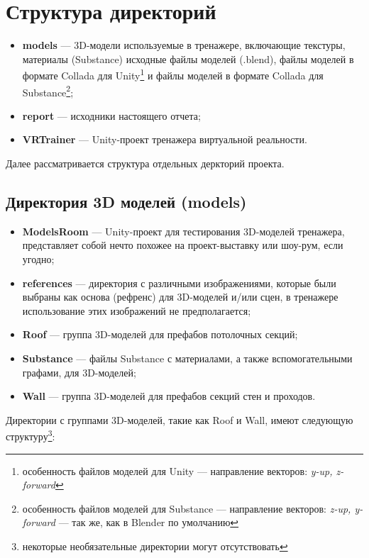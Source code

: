 




\section{Структура директорий}

\begin{itemize}
	\item \textbf{models} --- 3D-модели используемые в тренажере, включающие текстуры, материалы (Substance) исходные файлы моделей (.blend), файлы моделей в формате Collada для Unity\footnote{особенность файлов моделей для Unity --- направление векторов: \textit{y-up, z-forward}} и файлы моделей в формате Collada для Substance\footnote{особенность файлов моделей для Substance --- направление векторов: \textit{z-up, y-forward} --- так же, как в Blender по умолчанию};
	\item \textbf{report} --- исходники настоящего отчета;
	\item \textbf{VRTrainer} --- Unity-проект тренажера виртуальной реальности.
\end{itemize}

Далее рассматривается структура отдельных деркторий проекта.

\subsection{Директория 3D моделей (models)}

\begin{itemize}
	\item \textbf{ModelsRoom} --- Unity-проект для тестирования 3D-моделей тренажера, представляет собой нечто похожее на проект-выставку или шоу-рум, если угодно;
	\item \textbf{references} --- директория с различными изображениями, которые были выбраны как основа (рефренс) для 3D-моделей и/или сцен, в тренажере использование этих изображений не предполагается; 
	\item \textbf{Roof} --- группа 3D-моделей для префабов потолочных секций;
	\item \textbf{Substance} --- файлы Substance с материалами, а также вспомогательными графами, для 3D-моделей;
	\item \textbf{Wall} --- группа 3D-моделей для префабов секций стен и проходов.
\end{itemize}

Директории с группами 3D-моделей, такие как Roof и Wall, имеют следующую структуру\footnote{некоторые необязательные директории могут отсутствовать}:

